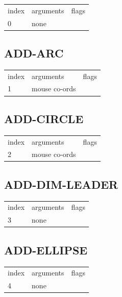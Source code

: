 \documentclass[a4paper]{report}
\begin{document}
{{{{{{{{{{{{{\begin{center}
\begin{tabular}{l | l | l}
index & arguments & flags \\
0 & none & 
\end{tabular}
\end{center}

\subsection{ADD-ARC}

\begin{center}
\begin{tabular}{l | l | l}
index & arguments & flags \\
1 & mouse co-ords & 
\end{tabular}
\end{center}

\subsection{ADD-CIRCLE}

\begin{center}
\begin{tabular}{l | l | l}
index & arguments & flags \\
2 & mouse co-ords & 
\end{tabular}
\end{center}

\subsection{ADD-DIM-LEADER}

\begin{center}
\begin{tabular}{l | l | l}
index & arguments & flags \\
3 & none & 
\end{tabular}
\end{center}

\subsection{ADD-ELLIPSE}

\begin{center}
\begin{tabular}{l | l | l}
index & arguments & flags \\
4 & none & 
\end{tabular}
\end{center}

}}}}}}}}}}}}}
\end{document}
